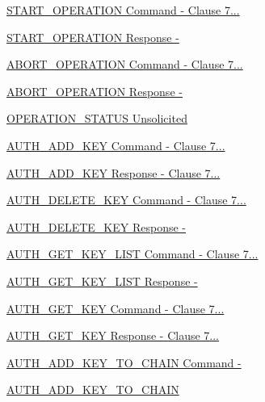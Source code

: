 \begin{DoxyCompactItemize}
\item 
\hyperlink{group__command__start__operation}{S\+T\+A\+R\+T\+\_\+\+O\+P\+E\+R\+A\+T\+I\+O\+N Command  -\/ Clause 7...}
\item 
\hyperlink{group__command__start__operation__response}{S\+T\+A\+R\+T\+\_\+\+O\+P\+E\+R\+A\+T\+I\+O\+N Response  -\/}
\item 
\hyperlink{group__command__abort__operation}{A\+B\+O\+R\+T\+\_\+\+O\+P\+E\+R\+A\+T\+I\+O\+N Command  -\/ Clause 7...}
\item 
\hyperlink{group__command__abort__operation__response}{A\+B\+O\+R\+T\+\_\+\+O\+P\+E\+R\+A\+T\+I\+O\+N Response  -\/}
\item 
\hyperlink{group__command__operation__status__response}{O\+P\+E\+R\+A\+T\+I\+O\+N\+\_\+\+S\+T\+A\+T\+U\+S Unsolicited}
\item 
\hyperlink{group__command__auth__add__key}{A\+U\+T\+H\+\_\+\+A\+D\+D\+\_\+\+K\+E\+Y Command  -\/ Clause 7...}
\item 
\hyperlink{group__command__auth__add__key__response}{A\+U\+T\+H\+\_\+\+A\+D\+D\+\_\+\+K\+E\+Y Response  -\/ Clause 7...}
\item 
\hyperlink{group__command__auth__delete__key}{A\+U\+T\+H\+\_\+\+D\+E\+L\+E\+T\+E\+\_\+\+K\+E\+Y Command  -\/ Clause 7...}
\item 
\hyperlink{group__command__auth__delete__key__response}{A\+U\+T\+H\+\_\+\+D\+E\+L\+E\+T\+E\+\_\+\+K\+E\+Y Response  -\/}
\item 
\hyperlink{group__command__auth__get__key__list}{A\+U\+T\+H\+\_\+\+G\+E\+T\+\_\+\+K\+E\+Y\+\_\+\+L\+I\+S\+T Command  -\/ Clause 7...}
\item 
\hyperlink{group__command__auth__get__key__list__response}{A\+U\+T\+H\+\_\+\+G\+E\+T\+\_\+\+K\+E\+Y\+\_\+\+L\+I\+S\+T Response  -\/}
\item 
\hyperlink{group__command__auth__get__key}{A\+U\+T\+H\+\_\+\+G\+E\+T\+\_\+\+K\+E\+Y Command  -\/ Clause 7...}
\item 
\hyperlink{group__command__auth__get__key__response}{A\+U\+T\+H\+\_\+\+G\+E\+T\+\_\+\+K\+E\+Y Response  -\/ Clause 7...}
\item 
\hyperlink{group__command__auth__add__key__to__chain}{A\+U\+T\+H\+\_\+\+A\+D\+D\+\_\+\+K\+E\+Y\+\_\+\+T\+O\+\_\+\+C\+H\+A\+I\+N Command  -\/}
\item 
\hyperlink{group__command__auth__add__key__to__chain__response}{A\+U\+T\+H\+\_\+\+A\+D\+D\+\_\+\+K\+E\+Y\+\_\+\+T\+O\+\_\+\+C\+H\+A\+IN}

\end{DoxyCompactItemize}
